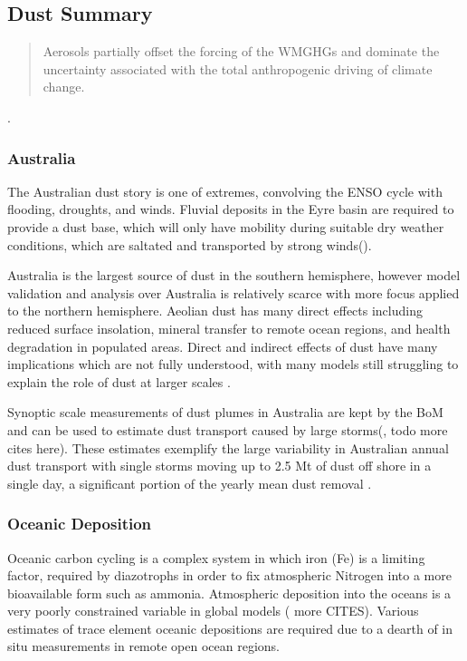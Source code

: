 \subsection{Dust Summary}
\begin{quote}
Aerosols partially offset the forcing of the WMGHGs and dominate the uncertainty associated with the total anthropogenic driving of climate change.
\end{quote} \cite{IPCC_2013_chap8}.
\subsubsection{Australia}

The Australian dust story is one of extremes, convolving the ENSO cycle with flooding, droughts, and winds.
Fluvial deposits in the Eyre basin are required to provide a dust base, which will only have mobility during suitable dry weather conditions, which are saltated and transported by strong winds(\cite{Zender_2003}).

Australia is the largest source of dust in the southern hemisphere, however model validation and analysis over Australia is relatively scarce with more focus applied to the northern hemisphere.
Aeolian dust has many direct effects including reduced surface insolation, mineral transfer to remote ocean regions, and health degradation in populated areas.
Direct and indirect effects of dust have many implications which are not fully understood, with many models still struggling to explain the role of dust at larger scales \cite{Rotstayn_2011}.

Synoptic scale measurements of dust plumes in Australia are kept by the BoM and can be used to estimate dust transport caused by large storms(\cite{Leys_2011}, todo more cites here). 
These estimates exemplify the large variability in Australian annual dust transport with single storms moving up to 2.5 Mt of dust off shore in a single day, a significant portion of the yearly mean dust removal \cite{Leys_2011,Shao_2007}.

\subsubsection{Oceanic Deposition}
Oceanic carbon cycling is a complex system in which iron (Fe) is a limiting factor, required by diazotrophs in order to fix atmospheric Nitrogen into a more bioavailable form such as ammonia.
Atmospheric deposition into the oceans is a very poorly constrained variable in global models (\cite{Grand_2015} more CITES).
Various estimates of trace element oceanic depositions are required due to a dearth of in situ measurements in remote open ocean regions.

